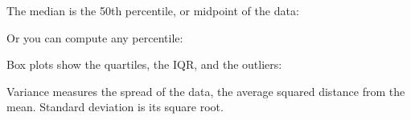\documentclass[letterpaper,10pt,english]{jupyterBook}
\begin{document}
\begin{sphinxVerbatim}[commandchars=\\\{\}]
 \PYG{p}{[}\PYG{p}{]} 
  
\end{sphinxVerbatim}

\sphinxAtStartPar
The median is the 50th percentile, or midpoint of the data:

\begin{sphinxVerbatim}[commandchars=\\\{\}]
 \PYG{p}{[}\PYG{p}{]} 
  
\end{sphinxVerbatim}

\sphinxAtStartPar
Or you can compute any percentile:

\begin{sphinxVerbatim}[commandchars=\\\{\}]
  
    \PYG{p}{[}\PYG{p}{]} \PYG{p}{[}    \PYG{p}{]} 
  \PYG{p}{[}\PYG{p}{]}  \PYG{p}{[}\PYG{p}{]}
\end{sphinxVerbatim}

\sphinxAtStartPar
Box plots show the quartiles, the IQR, and the outliers:

\begin{sphinxVerbatim}[commandchars=\\\{\}]
    
\end{sphinxVerbatim}

\sphinxAtStartPar
Variance measures the spread of the data, the average squared distance from the mean.
Standard deviation is its square root.
\end{document}
